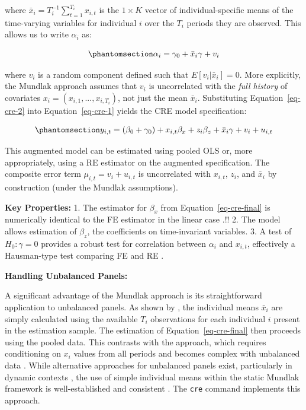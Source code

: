 \documentclass[bib]{statapress}
\begin{document}
where \(\bar x_{i} = T_i^{-1} \sum_{t=1}^{T_i} x_{i,t}\) is the
\(1 \times K\) vector of individual-specific means of the time-varying
variables for individual \(i\) over the \(T_i\) periods they are
observed. This allows us to write \(\alpha_i\) as:

\begin{equation}\phantomsection\label{eq-cre-2}{\alpha_i = \gamma_0 + \bar x_{i}\gamma + v_i
}\end{equation}

where \(v_i\) is a random component defined such that
\(E[v_i | \bar x_{i}] = 0\). More explicitly, the Mundlak approach
assumes that \(v_i\) is uncorrelated with the \emph{full history} of
covariates \(x_{i} = (x_{i,1}, ..., x_{i,T_i})\), not just the mean
\(\bar x_i\). Substituting Equation~\ref{eq-cre-2} into
Equation~\ref{eq-cre-1} yields the CRE model specification:

\begin{equation}\phantomsection\label{eq-cre-final}{y_{i,t} = (\beta_0 + \gamma_0) + x_{i,t}\beta_x + z_{i}\beta_z + \bar x_{i}\gamma + v_i + u_{i,t}
}\end{equation}

This augmented model can be estimated using pooled OLS or, more
appropriately, using a RE estimator on the augmented specification. The
composite error term \(\mu_{i,t} = v_i + u_{i,t}\) is uncorrelated with
\(x_{i,t}\), \(z_i\), and \(\bar x_{i}\) by construction (under the
Mundlak assumptions).

\textbf{Key Properties:} 1. The estimator for \(\beta_x\) from
Equation~\ref{eq-cre-final} is numerically identical to the FE estimator
in the linear case \citep[ chap
10]{mundlak1978pooling, wooldridge2010econometric}.!! 2. The model
allows estimation of \(\beta_z\), the coefficients on time-invariant
variables. 3. A test of \(H_0: \gamma = 0\) provides a robust test for
correlation between \(\alpha_i\) and \(x_{i,t}\), effectively a
Hausman-type test comparing FE and RE \citep{wooldridge2010econometric}.

\textbf{Handling Unbalanced Panels:}

A significant advantage of the Mundlak approach is its straightforward
application to unbalanced panels. As shown by \citet[sec
10.7.3]{wooldridge2019}, the individual means \(\bar x_i\) are simply
calculated using the available \(T_i\) observations for each individual
\(i\) present in the estimation sample. The estimation of
Equation~\ref{eq-cre-final} then proceeds using the pooled data. This
contrasts with the \citet{chamberlain1982multivariate} approach, which
requires conditioning on \(x_i\) values from all periods and becomes
complex with unbalanced data \citep{abrevaya2013}. While alternative
approaches for unbalanced panels exist, particularly in dynamic contexts
\citep{albarran2019correlated}, the use of simple individual means
within the static Mundlak framework is well-established and consistent
\citep{wooldridge2019}. The \texttt{cre} command implements this
approach.
\end{document}
